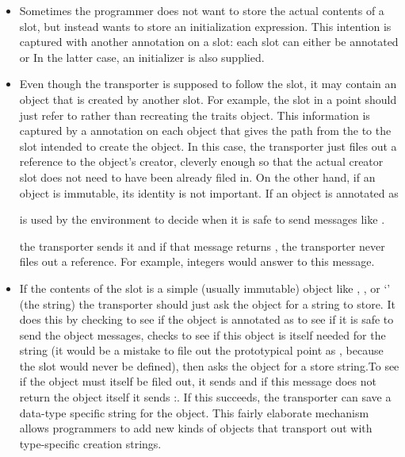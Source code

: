 \documentclass[letterpaper,10pt,english]{sphinxmanual}
\begin{document}
\begin{itemize}
\item {} 
Sometimes the programmer does not want to store the actual contents of a slot, but instead
wants to store an initialization expression. This intention is captured with another annotation
on a slot: each slot can either be annotated  or 
In the latter case, an initializer is also supplied.

\item {} 
Even though the transporter is supposed to follow the slot, it may contain an object that is created
by another slot. For example, the  slot in a point should just refer to 
rather than recreating the traits object. This information is captured by a  annotation
on each object that gives the path from the  to the slot intended to create the object.
In this case, the transporter just files out a reference to the object’s creator, cleverly
enough so that the actual creator slot does not need to have been already filed in. On the other
hand, if an object is immutable, its identity is not important. If an object is annotated as
\begin{footnote}[9]\sphinxAtStartFootnote
{} is used by the environment to decide when it is safe to send messages like .
%
\end{footnote} the transporter sends it  and if that message returns
, the transporter never files out a reference. For example, integers would answer
 to this message.

\item {} 
If the contents of the slot is a simple (usually immutable) object like , , or ‘’ (the
string) the transporter should just ask the object for a string to store. It does this by checking to
see if the object is annotated as  to see if it is safe to send the object messages,
checks to see if this object is itself needed for the string (it would be a mistake to file out the
prototypical point as , because the  slot would never be defined), then asks the object for a
store string.To see if the object must itself be filed out, it sends  and if
this message does not return the object itself it sends :. If this succeeds,
the transporter can save a data-type specific string for the object. This fairly elaborate mechanism
allows programmers to add new kinds of objects that transport out with type-specific creation
strings.


\end{itemize}
\end{document}
